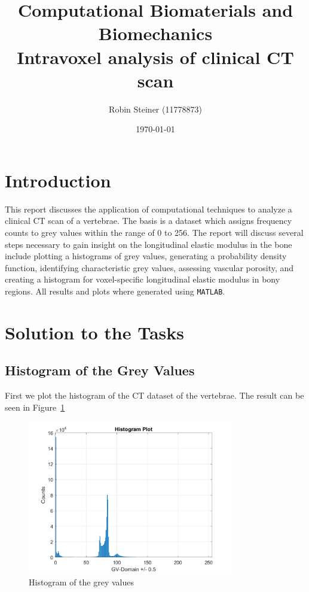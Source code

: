 \documentclass[a4paper,12pt]{article}
\begin{document}
    \title{Computational Biomaterials and Biomechanics\\[1ex]
    \Large Intravoxel analysis of clinical CT scan}
    \author{Robin Steiner (11778873)}
    \date{\today}
    \maketitle

    \thispagestyle{empty}
    \newpage

    \tableofcontents

    \newpage

    \section{Introduction}\label{sec:introduction}
    This report discusses the application of computational techniques to analyze a clinical CT scan of a vertebrae.
    The basis is a dataset which assigns frequency counts to grey values within the range of 0 to 256.
    The report will discuss several steps necessary to gain insight on the longitudinal elastic modulus in the bone include plotting a histograms of grey values, generating a probability density function, identifying characteristic grey values, assessing vascular porosity, and creating a histogram for voxel-specific longitudinal elastic modulus in bony regions.
    All results and plots where generated using \texttt{MATLAB}.

    \section{Solution to the Tasks}\label{sec:solution-to-the-tasks}

    \subsection{Histogram of the Grey Values}\label{subsec:histogram-of-the-grey-values}

    First we plot the histogram of the CT dataset of the vertebrae.
    The result can be seen in Figure~\ref{fig:histogram}
    \begin{figure}[h]
        \centering
        \includegraphics[width=0.8\textwidth]{histogram}
        \caption{Histogram of the grey values}
        \label{fig:histogram}
    \end{figure}
\end{document}
